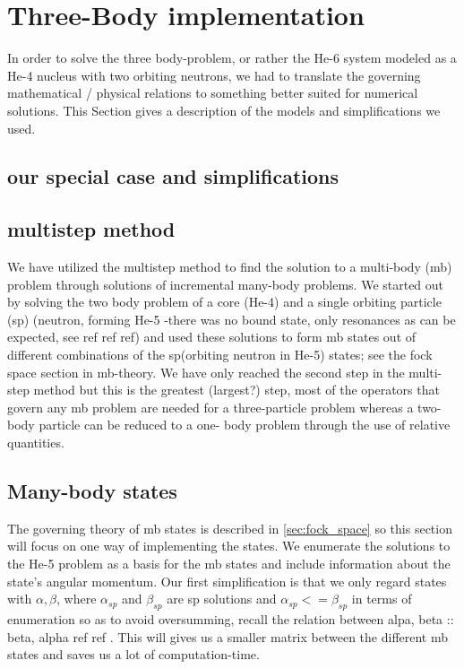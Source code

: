 \section{Three-Body implementation}
In order to solve the three body-problem, or rather the He-6 system modeled as a He-4 nucleus with two orbiting neutrons, we had to translate the governing mathematical / physical relations to something better suited for numerical solutions.
 This Section gives a description of the models and simplifications we used.

\subsection{our special case and simplifications}
\subsection{multistep method}
We have utilized the multistep method to find the solution to a multi-body (mb) problem through solutions of incremental many-body problems.
 We started out by solving the two body problem of a core (He-4) and a single orbiting particle (sp) (neutron, forming He-5 -there was no bound state, only resonances as can be expected, see ref ref ref) and used these solutions to form mb states out of different combinations of the sp(orbiting neutron in He-5) states; see the fock space section in mb-theory.
 We have only reached the second step in the multi-step method but this is the greatest (largest?) step, most of the operators that govern any mb problem are needed for a three-particle problem whereas a two-body particle can be reduced to a one- body problem through the use of relative quantities.
 
\subsection{Many-body states}
The governing theory of mb states is described in \ref{sec:fock_space} so this section will focus on one way of implementing the states. 
We enumerate the solutions to the He-5 problem as a basis for the mb states and include information about the state's angular momentum.
Our first simplification is that we only regard states with $\alpha, \beta$, where $\alpha_{sp}$ and $\beta_{sp} $ are sp solutions and $\alpha_{sp} <= \beta_{sp}$ in terms of enumeration so as to avoid oversumming, recall the relation between alpa, beta :: beta, alpha ref ref . 
This will gives us a smaller matrix between the different mb states and saves us a lot of computation-time.

